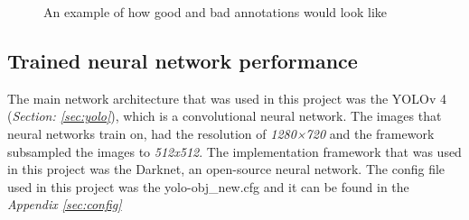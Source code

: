 \begin{figure}[h]
 \centering
 \hfill
 \caption{An example of how good and bad annotations would look like}
 \label{figure: goodandbad}
\end{figure}
\clearpage

\subsection{Trained neural network performance}
The main network architecture that was used in this project was the YOLOv 4 (\textit{Section: \ref{sec:yolo}}), which is a convolutional neural network.
The images that neural networks train on, had the resolution of \textit{1280×720} and the framework subsampled the images to \textit{512x512}. The implementation framework that was used in this project was the Darknet, an open-source neural network\cite{alexey_alexeyabdarknet_2021}. The config file used in this project was the yolo-obj\_new.cfg and it can be found in the \textit{Appendix \ref{sec:config}}


